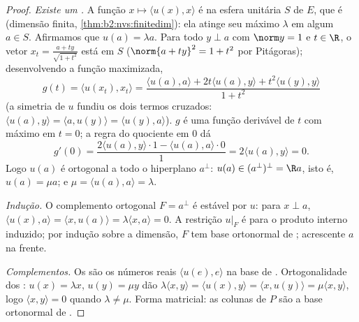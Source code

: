 \begin{proof}
\emph{Existe um .} A função $x \mapsto \langle u(x),
x\rangle$ é  na esfera unitária $S$ de $E$, que é
 (dimensão finita, \cref{thm:b2:nvs:finitedim}): ela atinge
seu máximo $\lambda$ em algum $a \in S$. Afirmamos que $u(a) = \lambda
a$. Para todo $y \perp a$ com $\norm y = 1$ e $t \in \R$, o
vetor $x_t = \frac{a + ty}{\sqrt{1 + t^2}}$ está em $S$
($\norm{a + ty}^2 = 1 + t^2$ por Pitágoras); desenvolvendo
a função maximizada,
\[
g(t) = \langle u(x_t), x_t\rangle
= \frac{\langle u(a), a\rangle + 2t\langle u(a), y\rangle +
t^2\langle u(y), y\rangle}{1 + t^2}
\]
(a simetria de $u$ fundiu os dois termos cruzados: $\langle u(a),
y\rangle = \langle a, u(y)\rangle = \langle u(y), a\rangle$).
$g$ é uma função derivável de $t$ com máximo em $t =
0$; a regra do quociente em $0$ dá
\[
g'(0) = \frac{2\langle u(a), y\rangle\cdot 1 - \langle u(a),
a\rangle\cdot 0}{1} = 2\langle u(a), y\rangle = 0 .
\]
Logo $u(a)$ é ortogonal a todo o hiperplano $a^\perp$: $u(a)
\in (a^{\perp})^{\perp} = \R a$, isto é, $u(a) = \mu a$; e $\mu =
\langle u(a), a\rangle = \lambda$.

\emph{Indução.} O complemento ortogonal $F = a^\perp$ é
estável por $u$: para $x \perp a$, $\langle u(x), a\rangle = \langle x,
u(a)\rangle = \lambda\langle x, a\rangle = 0$. A restrição
$u|_F$ é  para o produto interno induzido; por indução sobre
a dimensão, $F$ tem base ortonormal de ; acrescente $a$ na frente.

\emph{Complementos.} Os  são os números reais $\langle u(e),
e\rangle$ na base de . Ortogonalidade dos : $u(x) =
\lambda x$, $u(y) = \mu y$ dão $\lambda\langle x, y\rangle =
\langle u(x), y\rangle = \langle x, u(y)\rangle = \mu\langle x,
y\rangle$, logo $\langle x, y\rangle = 0$ quando $\lambda \neq \mu$.
Forma matricial: as colunas de $P$ são a base ortonormal de .
\end{proof}

